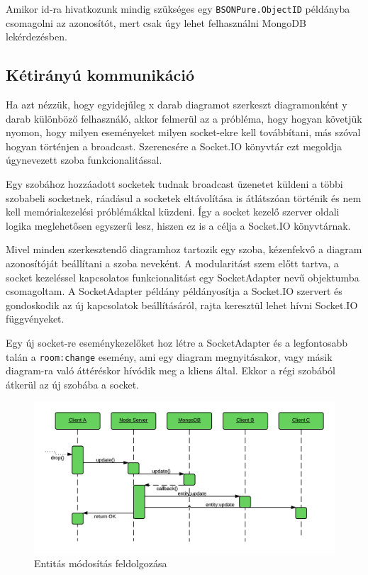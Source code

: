 Amikor id-ra hivatkozunk mindig szükséges egy \lstinline{BSONPure.ObjectID} példányba csomagolni az azonosítót, mert csak úgy lehet felhasználni MongoDB lekérdezésben.

\subsection{Kétirányú kommunikáció}

Ha azt nézzük, hogy egyidejűleg x darab diagramot szerkeszt diagramonként y darab különböző felhasználó, akkor felmerül az a próbléma, hogy hogyan követjük nyomon, hogy milyen eseményeket milyen socket-ekre kell továbbítani, más szóval hogyan történjen a broadcast. Szerencsére a Socket.IO könyvtár ezt megoldja úgynevezett szoba funkcionalitással.

 Egy szobához hozzáadott socketek tudnak broadcast üzenetet küldeni a többi szobabeli socketnek, ráadásul a socketek eltávolítása is átlátszóan történik és nem kell memóriakezelési próblémákkal küzdeni. Így a socket kezelő szerver oldali logika meglehetősen egyszerű lesz, hiszen ez is a célja a Socket.IO könyvtárnak. 

Mivel minden szerkesztendő diagramhoz tartozik egy szoba, kézenfekvő a diagram azonosítóját beállítani a szoba neveként. A modularitást szem előtt tartva, a socket kezeléssel kapcsolatos funkcionalitást egy SocketAdapter nevű objektumba csomagoltam. A SocketAdapter példány példányosítja a Socket.IO szervert és gondoskodik az új kapcsolatok beállításáról, rajta keresztül lehet hívni Socket.IO függvényeket.

Egy új socket-re eseménykezelőket hoz létre a SocketAdapter és a legfontosabb talán a \lstinline{room:change} esemény, ami egy diagram megnyitásakor, vagy másik diagram-ra való áttéréskor hívódik meg a kliens által. Ekkor a régi szobából átkerül az új szobába a socket. 

\begin{figure}[!ht]
\centering
\includegraphics[width=15cm,keepaspectratio]{figures/collaboration-seq.png}
\caption{Entitás módosítás feldolgozása}
\label{fig:entityupdate}
\end{figure}

